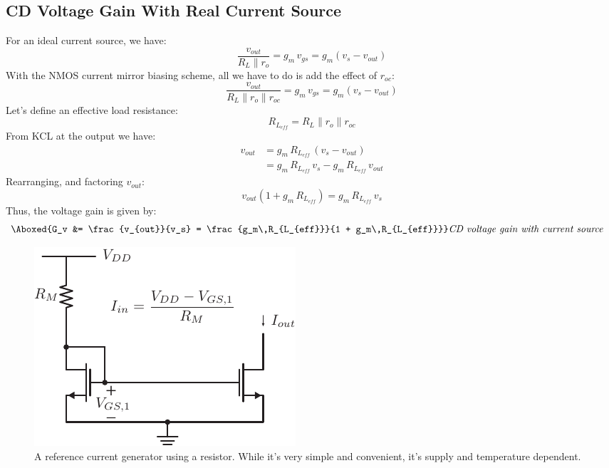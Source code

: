 \subsection{CD Voltage Gain With Real Current Source}
For an ideal current source, we have:
    \begin{equation}
        \frac{v_{out}}{R_L \parallel r_o} = g_m\,v_{gs} = g_m(v_s - v_{out})
    \end{equation}
With the NMOS current mirror biasing scheme, all we have to do is add the effect of $r_{oc}$: 
    \begin{equation}
        \frac{v_{out}}{R_L \parallel r_o \parallel r_{oc}} = g_m\,v_{gs} = g_m(v_s - v_{out})
    \end{equation}
Let's define an effective load resistance:
    \begin{equation}
        R_{L_{eff}} =  R_L \parallel r_o \parallel r_{oc}
    \end{equation}
From KCL at the output we have:
    \begin{align}
        v_{out} &= g_m\,R_{L_{eff}}\,(v_s - v_{out})\\
        &= g_m\,R_{L_{eff}}\,v_s - g_m\,R_{L_{eff}}\,v_{out}
    \end{align}
Rearranging, and factoring $v_{out}$:
    \begin{equation}
        v_{out} \left(1 + g_m\,R_{L_{eff}}\right) = g_m\,R_{L_{eff}}\,v_s
    \end{equation}
Thus, the voltage gain is given by:
    \begin{align}
        \Aboxed{G_v &= \frac{v_{out}}{v_s} = \frac{g_m\,R_{L_{eff}}}{1 + g_m\,R_{L_{eff}}}}
        &\textit{CD voltage gain with current source}
    \end{align}
\newpage
\begin{figure}[t]
\centering
\includegraphics[scale=1.5]{mirror_resistor.pdf}
\caption{A reference current generator using a resistor.  While it's very simple and convenient, it's supply and temperature dependent.}
\label{fig:iref_gen_rs}
\end{figure}

